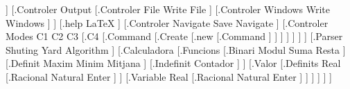\documentclass[border=2]{standalone}
\begin{document}
\Tree [.Main [.{Controler Central}
%
	[.Systema
		[.{Controler Input}
			[.{Controler Key} {Read Key} ]
			[.{Controler File} {Read File} ]
		]
%
%
		[.{Controler Output}
			[.{Controler File} {Write File} ]
			[.{Controler Windows} {Write Windows} ]
		]
%
		[.help {\LaTeX} ]
%
		[.{Controler Navigate}
			{Save Navigate}
		]
%
		[.{Controler Modes}
			C1
			C2
			C3
			[.C4 [.Command [.Create [.new [.Command ] ] ] ] ]
		]
	]
	[.Parser {Shuting Yard Algorithm} ]
	[.Calculadora
		[.Funcions
			[.Binari
				Modul
				Suma
				Resta
			]
			[.Definit
				Maxim
				Minim
				Mitjana
			]
			[.Indefinit Contador ]
		]
		[.Valor
			[.Definits
				Real
				[.Racional Natural Enter ]
			]
			[.Variable
				Real
				[.Racional Natural Enter ]
			]
		]
	]
] ]
\end{document}
